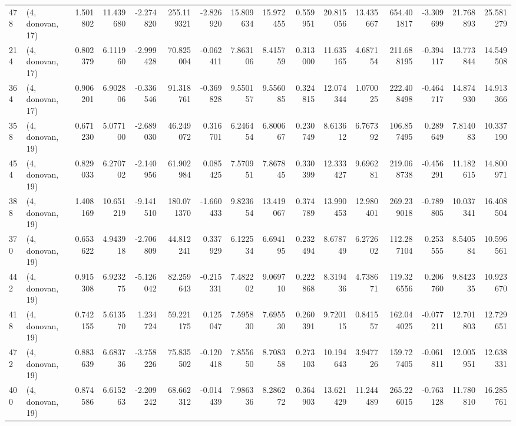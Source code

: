 \begin{tabular}{llrrrrrrrrrrrrrr}
478 &  (4, donovan, 17) &   1.501802 &  11.439680 &  -2.274820 &   255.119321 &  -2.826920 &  15.809634 &  15.972455 &  0.559951 &  20.815056 &  13.435667 &    654.401817 &   -3.309699 &   21.768893 &   25.581279 \\
214 &  (4, donovan, 17) &   0.802379 &   6.111960 &  -2.999428 &    70.825004 &  -0.062411 &   7.863106 &   8.415759 &  0.313000 &  11.635165 &   4.687154 &    211.688195 &   -0.394117 &   13.773844 &   14.549508 \\
364 &  (4, donovan, 17) &   0.906201 &   6.902806 &  -0.336546 &    91.318761 &  -0.369828 &   9.550157 &   9.556085 &  0.324815 &  12.074344 &   1.070025 &    222.408498 &   -0.464717 &   14.874930 &   14.913366 \\
358 &  (4, donovan, 19) &   0.671230 &   5.077100 &  -2.689030 &    46.249072 &   0.316701 &   6.246454 &   6.800667 &  0.230749 &   8.613612 &   6.767392 &    106.857495 &    0.289649 &    7.814083 &   10.337190 \\
454 &  (4, donovan, 19) &   0.829033 &   6.270702 &  -2.140956 &    61.902984 &   0.085425 &   7.570951 &   7.867845 &  0.330399 &  12.333427 &   9.696281 &    219.068738 &   -0.456291 &   11.182615 &   14.800971 \\
388 &  (4, donovan, 19) &   1.408169 &  10.651219 &  -9.141510 &   180.071370 &  -1.660433 &   9.823654 &  13.419067 &  0.374789 &  13.990453 &  12.980401 &    269.239018 &   -0.789805 &   10.037341 &   16.408504 \\
370 &  (4, donovan, 19) &   0.653622 &   4.943918 &  -2.706809 &    44.812241 &   0.337929 &   6.122534 &   6.694195 &  0.232494 &   8.678749 &   6.272602 &    112.287104 &    0.253555 &    8.540584 &   10.596561 \\
442 &  (4, donovan, 19) &   0.915308 &   6.923275 &  -5.126042 &    82.259643 &  -0.215331 &   7.482202 &   9.069710 &  0.222868 &   8.319436 &   4.738671 &    119.326556 &    0.206760 &    9.842335 &   10.923670 \\
418 &  (4, donovan, 19) &   0.742155 &   5.613570 &   1.234724 &    59.221175 &   0.125047 &   7.595830 &   7.695530 &  0.260391 &   9.720115 &   0.841557 &    162.044025 &   -0.077211 &   12.701803 &   12.729651 \\
472 &  (4, donovan, 19) &   0.883639 &   6.683736 &  -3.758226 &    75.835502 &  -0.120418 &   7.855650 &   8.708358 &  0.273103 &  10.194643 &   3.947726 &    159.727405 &   -0.061811 &   12.005951 &   12.638331 \\
400 &  (4, donovan, 19) &   0.874586 &   6.615263 &  -2.209242 &    68.662312 &  -0.014439 &   7.986336 &   8.286272 &  0.364903 &  13.621429 &  11.244489 &    265.226015 &   -0.763128 &   11.780810 &   16.285761 \\

\end{tabular}
